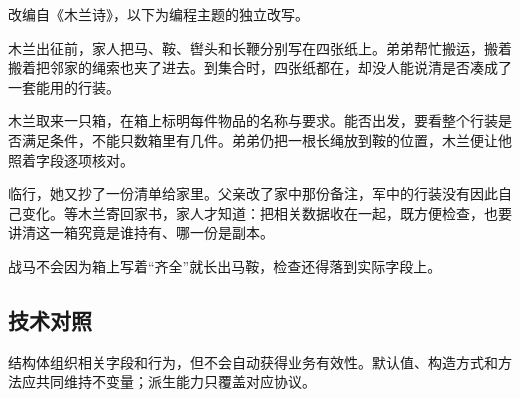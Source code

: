 改编自《木兰诗》，以下为编程主题的独立改写。

木兰出征前，家人把马、鞍、辔头和长鞭分别写在四张纸上。弟弟帮忙搬运，搬着搬着把邻家的绳索也夹了进去。到集合时，四张纸都在，却没人能说清是否凑成了一套能用的行装。

木兰取来一只箱，在箱上标明每件物品的名称与要求。能否出发，要看整个行装是否满足条件，不能只数箱里有几件。弟弟仍把一根长绳放到鞍的位置，木兰便让他照着字段逐项核对。

临行，她又抄了一份清单给家里。父亲改了家中那份备注，军中的行装没有因此自己变化。等木兰寄回家书，家人才知道：把相关数据收在一起，既方便检查，也要讲清这一箱究竟是谁持有、哪一份是副本。

战马不会因为箱上写着“齐全”就长出马鞍，检查还得落到实际字段上。

\subsection*{技术对照}

结构体组织相关字段和行为，但不会自动获得业务有效性。默认值、构造方式和方法应共同维持不变量；派生能力只覆盖对应协议。
